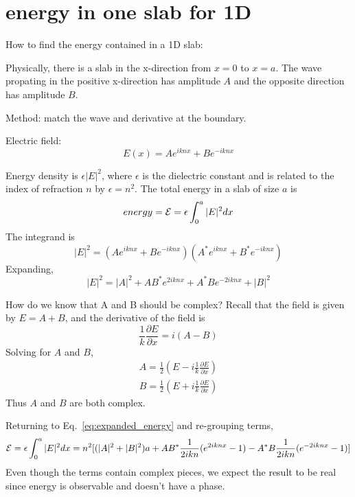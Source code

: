 \section{energy in one slab for 1D}

How to find the energy contained in a 1D slab:

Physically, there is a slab in the x-direction from $x=0$ to $x=a$. The wave propating in the positive x-direction has amplitude $A$ and the opposite direction has amplitude $B$. 

Method: match the wave and derivative at the boundary.

Electric field:
\begin{equation}
 E(x) = A e^{i k n x} + B e^{-i k n x}
\end{equation}

Energy density is $\epsilon |E|^2$, where $\epsilon$ is the dielectric constant and is related to the index of refraction $n$ by $\epsilon=n^2$. The total energy in a slab of size $a$ is 
\begin{equation}
 energy = {\cal E} = \epsilon \int_0^a |E|^2 dx
\end{equation}
The integrand is
\begin{equation}
 |E|^2 = (A e^{i k n x} + B e^{-i k n x})(A^* e^{i k n x} + B^* e^{-i k n x})
\end{equation}
Expanding,
\begin{equation}
 |E|^2 = |A|^2+ AB^* e^{2 i k n x} + A^* B e^{-2 i k n x} + |B|^2
\label{eq:expanded_energy}
\end{equation}

How do we know that A and B should be complex? Recall that the field is given by $E=A+B$, and the derivative of the field is
\begin{equation}
 \frac{1}{k} \frac{\partial E}{ \partial x} = i (A-B)
\end{equation}
Solving for $A$ and $B$, 
\begin{equation}
 \begin{gathered}
  A= \frac{1}{2} (E-i\frac{1}{k} \frac{\partial E}{ \partial x}) \\
  B= \frac{1}{2} (E+i\frac{1}{k} \frac{\partial E}{ \partial x})
 \end{gathered}
\end{equation}
Thus $A$ and $B$ are both complex.

Returning to Eq.~\ref{eq:expanded_energy} and re-grouping terms,
\begin{equation}
 {\cal E} = \epsilon \int_0^a |E|^2 dx = n^2 [(|A|^2+|B|^2)a + AB^* \frac{1}{2ikn}(e^{2 i k n x}-1) - A^*B\frac{1}{2ikn}(e^{-2 i k n x}-1)]
\label{eq:energy_integral}
\end{equation}
Even though the terms contain complex pieces, we expect the result to be real since energy is observable and doesn't have a phase.

